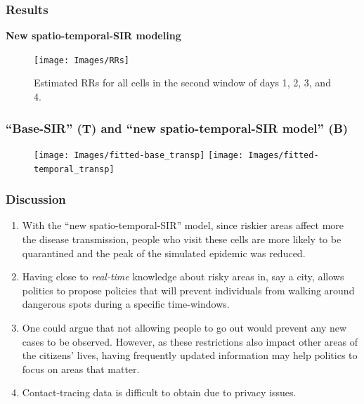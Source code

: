 \documentclass[12pt, aspectratio = 169]{beamer} %
\begin{document}
	\begin{frame}[t]
		\frametitle{Results}
		\justifying	
		\textcolor{titles}{\textbf{New spatio-temporal-SIR modeling}}
		
		\begin{figure}
			\centering \vspace{-8pt}
			\texttt{[image: Images/RRs]} \vspace{-10pt}
			\caption{\justifying Estimated RRs for all cells in the second window of days 1, 2, 3, and 4.}
			\label{fig:estimatedRR}
		\end{figure}\vspace{-6pt}
		
	\end{frame}


	\begin{frame}[t]
		\frametitle{``Base-SIR'' (T) and ``new spatio-temporal-SIR model'' (B) }
		\justifying	
	
		\begin{figure}
			\centering \vspace{-6pt}
			\texttt{[image: Images/fitted-base\_transp]} \vspace{-30pt}
			\texttt{[image: Images/fitted-temporal\_transp]} \vspace{-30pt}
			\label{fig:fitted-temporal}
		\end{figure}\vspace{-6pt}
	\end{frame}

	\begin{frame}[t]
		\frametitle{Discussion}
		\justifying	
		\begin{enumerate}
			\item \justifying With the ``new spatio-temporal-SIR'' model, since riskier areas affect more the disease transmission, people who visit these cells are more likely to be quarantined and the peak of the simulated epidemic was reduced.\pause
			\item \justifying Having close to \textit{real-time} knowledge about risky areas in, say a city, allows politics to propose policies that will prevent individuals from walking around dangerous spots during a specific time-windows.\pause
			\item \justifying One could argue that not allowing people to go out would prevent any new cases to be observed. However, as these restrictions also impact other areas of the citizens’ lives, having frequently updated information may help politics to focus on areas that matter.\pause
			\item \justifying Contact-tracing data is difficult to obtain due to privacy issues.
		\end{enumerate}
	\end{frame}
			
\end{document}
